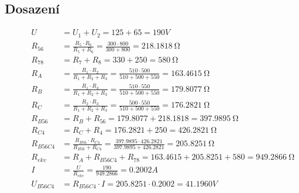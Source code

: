 \subsection{Dosazení}
\begin{figure}[H]

  \begin{equation*}
    \begin{aligned}
      U          & = U_1 + U_2 = 125 + 65 = 190V                                                                     \\
      R_{56}     & = \frac{R_5 \cdot R_6}{R_5 + R_6} = \frac{300 \cdot 800}{300 + 800} = 218.1818 \SI{}{\ohm}        \\
      R_{78}     & = R_7 + R_8 = 330 + 250 = 580 \SI{}{\ohm}                                                         \\
      R_A        & = \frac{R_1 \cdot R_2}{R_1 + R_2 + R_3} = \frac{510 \cdot 500}{510 + 500 + 550} = 163.4615\SI{}{\ohm}                                                                                                         \\
      R_B        & = \frac{R_1 \cdot R_3}{R_1 + R_2 + R_3} = \frac{510 \cdot 550}{510 + 500 + 550} = 179.8077\SI{}    {\ohm}                                                                                                         \\
      R_C        & = \frac{R_2 \cdot R_3}{R_1 + R_2 + R_3} = \frac{500 \cdot 550}{510 + 500 + 550} = 176.2821\SI{}    {\ohm}                                                                                                         \\
      R_{B56}    & = R_B + R_{56} = 179.8077 + 218.1818 = 397.9895 \SI{}{\ohm}                                       \\
      R_{C4}     & = R_C + R_4 = 176.2821 + 250 = 426.2821 \SI{}{\ohm}                                               \\
      R_{B56C4}  & = \frac{R_{B56} \cdot R_{C4}}{R_{B56} + R_{C4}} = \frac{397.9895 \cdot 426.2821}{397.9895 + 426.2821} = 205.8251 \SI{}{\ohm}                                                                               \\
      R_{ekv}    & = R_A + R_{B56C4} + R_{78} = 163.4615 + 205.8251 + 580 = 949.2866 \SI{}{\ohm}                     \\
      I          & = \frac{U}{R_{ekv}} = \frac{190}{949.2866} = 0.2002A                                              \\
      U_{B56C4}  & = R_{B56C4} \cdot I = 205.8251 \cdot 0.2002 = 41.1960V                                            \\

\end{aligned}
\end{equation*}
\end{figure}
